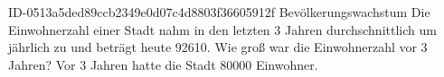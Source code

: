 \begin{exercise}
      {ID-0513a5ded89ccb2349e0d07c4d8803f36605912f}
      {Bevölkerungswachstum}
  \ifproblem\problem
    Die Einwohnerzahl einer Stadt nahm in den letzten 3 Jahren
    durchschnittlich um  jährlich zu und beträgt heute \num{92610}.
    Wie groß war die Einwohnerzahl vor 3 Jahren?
  \fi
  \ifoutcome\outcome
    Vor 3 Jahren hatte die Stadt \num{80000} Einwohner.
  \fi
\end{exercise}
